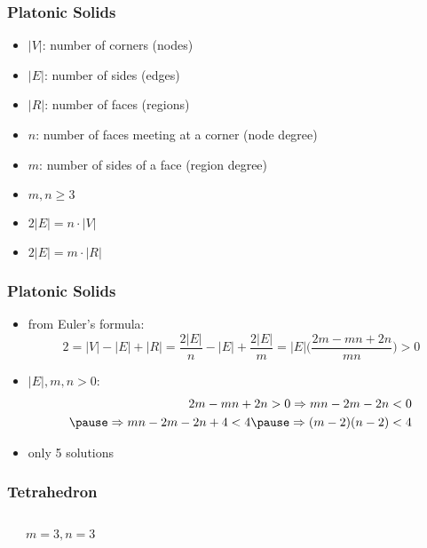 \documentclass[dvipsnames]{beamer}
\begin{document}
\begin{frame}
  \frametitle{Platonic Solids}

  \begin{itemize}
    \item $|V|$: number of corners (nodes)
    \item $|E|$: number of sides (edges)
    \item $|R|$: number of faces (regions)
    \item $n$: number of faces meeting at a corner (node degree)
    \item $m$: number of sides of a face (region degree)
  \end{itemize}

  \pause
  \begin{itemize}
    \item $m,n \geq 3$
    \item $2|E| = n \cdot |V|$
    \item $2|E| = m \cdot |R|$
  \end{itemize}
\end{frame}

\begin{frame}
  \frametitle{Platonic Solids}

    \begin{itemize}
      \item from Euler's formula:
      \[
        2 = |V| - |E| + |R| = \frac{2|E|}{n} - |E| + \frac{2|E|}{m}
        = |E| \Big( \frac{2m-mn+2n}{mn} \Big) > 0
      \]

      \pause
      \item $|E|,m,n > 0$:
      \begin{eqnarray*}
        2m - mn + 2n > 0 \Rightarrow mn - 2m -2n < 0 \\\pause
        \Rightarrow mn - 2m - 2n + 4 < 4 \pause \Rightarrow (m - 2)(n - 2) < 4
      \end{eqnarray*}

      \pause
      \item only 5 solutions
    \end{itemize}
\end{frame}

\begin{frame}
  \frametitle{Tetrahedron}

  \begin{columns}
    \begin{center}
    \end{center}

    \begin{center}

      $m=3, n=3$
    \end{center}
  \end{columns}
\end{frame}
\end{document}
